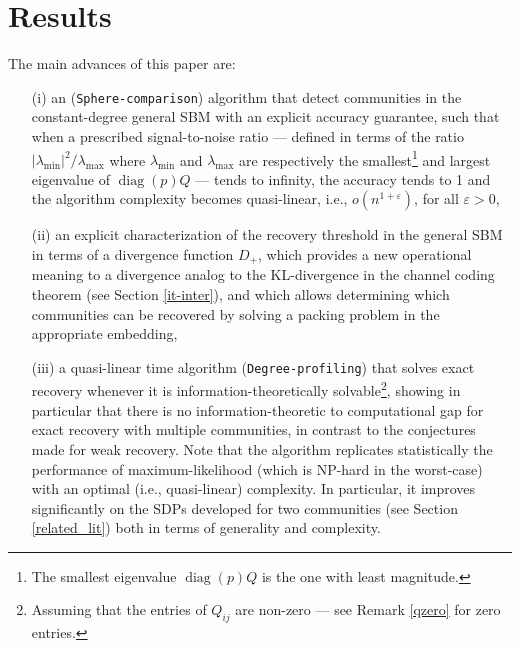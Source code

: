 \documentclass[11pt]{article}
\newcommand{\dd}{D_+}
\newcommand{\e}{\varepsilon}
\DeclareMathOperator{\diag}{diag}
\newcommand{\1}{\mathbb{1}}
\begin{document}



\section{Results}\label{res-sec}
The main advances of this paper are:
\begin{itemize}
\item[(i)] an ({\tt Sphere-comparison}) algorithm that detect communities in the constant-degree general SBM with an explicit accuracy guarantee, such that when a prescribed signal-to-noise ratio --- defined in terms of the ratio $|\lambda_{\mathrm{min}}|^2/\lambda_{\mathrm{max}}$ where $\lambda_{\mathrm{min}}$ and $\lambda_{\mathrm{max}}$ are respectively the smallest\footnote{The smallest eigenvalue $\diag(p)Q$ is the one with least magnitude.} and largest eigenvalue of $\diag(p)Q$ --- tends to infinity, the accuracy tends to 1 and the algorithm complexity becomes quasi-linear, i.e., $o(n^{1+ \e})$, for all $\e>0$,
\item[(ii)] an explicit characterization of the recovery threshold in the general SBM in terms of a divergence function $D_+$, which provides a new operational meaning to a divergence analog to the KL-divergence in the channel coding theorem (see Section \ref{it-inter}), and which allows determining which communities can be recovered by solving a packing problem in the appropriate embedding, 
\item[(iii)] a quasi-linear time algorithm ({\tt Degree-profiling}) that solves exact recovery whenever it is information-theoretically solvable\footnote{Assuming that the entries of $Q_{ij}$ are non-zero --- see Remark \ref{qzero} for zero entries.}, showing in particular that there is no information-theoretic to computational gap for exact recovery with multiple communities, in contrast to the conjectures made for weak recovery. Note that the algorithm replicates statistically the performance of maximum-likelihood (which is NP-hard in the worst-case) with an optimal (i.e., quasi-linear) complexity. In particular, it improves significantly on the SDPs developed for two communities (see Section \ref{related_lit}) both in terms of generality and complexity.
\end{itemize}
\end{document}
